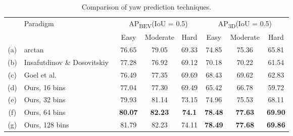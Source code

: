 \begin{table}
\centering
\begin{tabular}{c l c c c  c c c  }
\toprule
   &\multirow{2}{*}{Paradigm}                                 & \multicolumn{3}{c}{AP\textsubscript{BEV}(IoU = 0.5)} & \multicolumn{3}{c}{AP\textsubscript{3D}(IoU = 0.5)} \\
   &                                                          & Easy                                                 & Moderate                                              & Hard           & Easy           & Moderate       & Hard \\
\cmidrule(lr){2-2}
\cmidrule(lr){3-5}
\cmidrule(lr){6-8}
(a)& arctan                                             & 76.65                                                & 79.05                                                 & 69.33          & 74.85          & 75.36          & 65.81 \\
(b)&Insafutdinov \& Dosovitskiy~\cite{insafutdinov18pointclouds} & 77.28                                                & 76.92                                                 & 69.12          & 70.18          & 70.22          & 61.54 \\
(c)&Goel et al.~\cite{goel20shape}                            & 76.49                                                & 77.35                                                 & 69.69          & 68.43          & 69.62          & 62.83\\
\midrule
(d)&Ours, 16 bins       & 77.04                & 77.30              & 69.49          & 65.42          & 66.78          & 59.72 \\
(e)&Ours, 32 bins       & 79.93                & 81.14              & 73.15          & 74.96          & 75.53          & 68.11 \\
(f)&Ours, 64 bins       & \textbf{80.07}       & \textbf{82.23}     & \textbf{74.1} & \textbf{78.48} & \textbf{77.63} & \textbf{69.90} \\
(g)&Ours, 128 bins      & 81.79                & 82.23              & 74.11          & \textbf{78.49} & \textbf{77.68} & \textbf{69.86} \\
\bottomrule
\end{tabular}
\caption{Comparison of yaw prediction techniques.}\label{t:yaw}
\end{table}